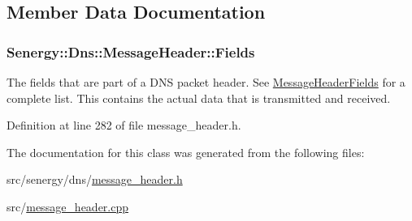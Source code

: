 \subsection{Member Data Documentation}
\hypertarget{class_senergy_1_1_dns_1_1_message_header_a014c173ce2b2c5bb06ae9e5d0e201159}{
\subsubsection[{Fields}]{ Senergy\-::\-Dns\-::\-Message\-Header\-::\-Fields}}\label{class_senergy_1_1_dns_1_1_message_header_a014c173ce2b2c5bb06ae9e5d0e201159}


The fields that are part of a D\-N\-S packet header. See \hyperlink{struct_senergy_1_1_dns_1_1_message_header_fields}{Message\-Header\-Fields} for a complete list. This contains the actual data that is transmitted and received. 



Definition at line 282 of file message\-\_\-header.\-h.



The documentation for this class was generated from the following files\-:\begin{DoxyCompactItemize}
\item 
src/senergy/dns/\hyperlink{message__header_8h}{message\-\_\-header.\-h}\item 
src/\hyperlink{message__header_8cpp}{message\-\_\-header.\-cpp}\end{DoxyCompactItemize}

